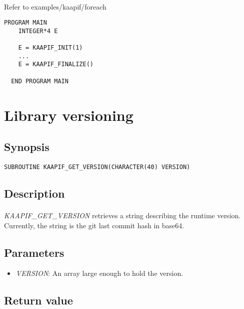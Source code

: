 \documentclass[a4paper, 11pt]{article}
\begin{document}
\paragraph{}
Refer to examples/kaapif/foreach\\
\begin{small}
\begin{lstlisting}[frame=tb]
  PROGRAM MAIN
    INTEGER*4 E

    E = KAAPIF_INIT(1)
    ...
    E = KAAPIF_FINALIZE()

  END PROGRAM MAIN
\end{lstlisting}
\end{small}


\newpage
\section{Library versioning}

\subsection{Synopsis}
\begin{small}
\lstset{language=C}
\begin{lstlisting}[frame=tb]
SUBROUTINE KAAPIF_GET_VERSION(CHARACTER(40) VERSION)
\end{lstlisting}
\end{small}

\subsection{Description}
\paragraph{}
\textit{KAAPIF\_GET\_VERSION} retrieves a string describing the runtime version.
Currently, the string is the git last commit hash in base64.

\subsection{Parameters}
\begin{itemize}
\item \textit{VERSION}: An array large enough to hold the version.
\end{itemize}

\subsection{Return value}
\end{document}
